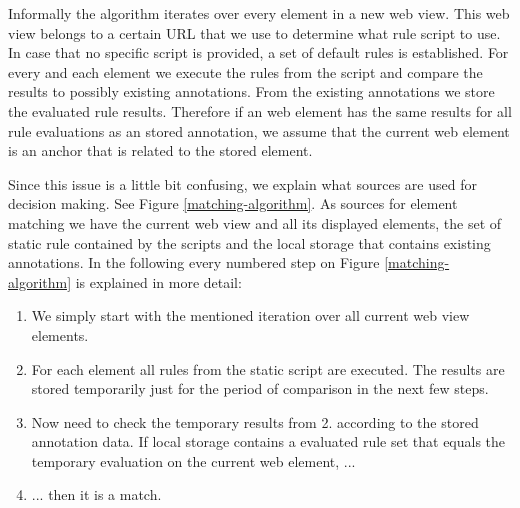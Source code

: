 Informally the algorithm iterates over every element in a new web view. This web view belongs to a certain URL that we use to determine what rule script to use. In case that no specific script is provided, a set of default rules is established. For every and each element we execute the rules from the script and compare the results to possibly existing annotations. From the existing annotations we store the evaluated rule results. Therefore if an web element has the same results for all rule evaluations as an stored annotation, we assume that the current web element is an anchor that is related to the stored element. 

Since this issue is a little bit confusing, we explain what sources are used for decision making. See Figure \ref{matching-algorithm}. As sources for element matching we have the current web view and all its displayed elements, the set of static rule contained by the scripts and the local storage that contains existing annotations. In the following every numbered step on Figure \ref{matching-algorithm} is explained in more detail:

\begin{enumerate}
\item We simply start with the mentioned iteration over all current web view elements. 

\item For each element all rules from the static script are executed. The results are stored temporarily just for the period of comparison in the next few steps.

\item Now need to check the temporary results from 2. according to the stored annotation data. If local storage contains a evaluated rule set that equals the temporary evaluation on the current web element, ...

\item ... then it is a match. 
\end{enumerate}


